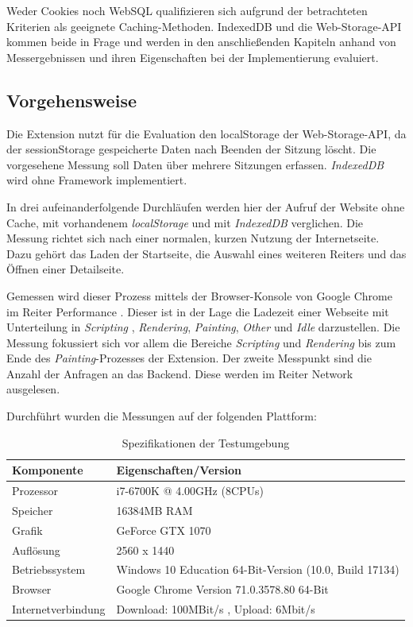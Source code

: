 Weder Cookies noch WebSQL qualifizieren sich aufgrund der betrachteten Kriterien als geeignete Caching-Methoden. IndexedDB und die Web-Storage-API kommen beide in Frage und werden in den anschließenden Kapiteln anhand von Messergebnissen und ihren Eigenschaften bei der Implementierung evaluiert.

\subsection{Vorgehensweise}
\label{ss:vorgehensweise}

Die Extension nutzt für die Evaluation den \glqq localStorage \grqq{} der Web-Storage-API, da der \glqq sessionStorage \grqq{} gespeicherte Daten nach Beenden der Sitzung löscht. Die vorgesehene Messung soll Daten über mehrere Sitzungen erfassen. \textit{IndexedDB} wird ohne Framework implementiert.

In drei aufeinanderfolgende Durchläufen werden hier der Aufruf der Website ohne Cache, mit vorhandenem \textit{localStorage} und mit \textit{IndexedDB} verglichen. Die Messung richtet sich nach einer normalen, kurzen Nutzung der Internetseite. Dazu gehört das Laden der Startseite, die Auswahl eines weiteren Reiters und das Öffnen einer Detailseite. 

Gemessen wird dieser Prozess mittels der Browser-Konsole von Google Chrome im Reiter \glqq Performance \grqq{}. Dieser ist in der Lage die Ladezeit einer Webseite mit Unterteilung in \textit{Scripting} , \textit{Rendering}, \textit{Painting}, \textit{Other} und \textit{Idle} darzustellen. Die Messung fokussiert sich vor allem die Bereiche \textit{Scripting} und \textit{Rendering} bis zum Ende des \textit{Painting}-Prozesses der Extension. Der zweite Messpunkt sind die Anzahl der Anfragen an das Backend. Diese werden im Reiter \glqq Network \grqq ausgelesen.

Durchführt wurden die Messungen auf der folgenden Plattform:

\begin{table}[h]
	\begin{tabular}{p{4.6cm}R{7.0cm}}
		\toprule
		\textbf{Komponente}	&	\textbf{Eigenschaften/Version}	\\
		\midrule
		Prozessor	&	i7-6700K @ 4.00GHz (8CPUs)	\\
		Speicher	&	16384MB RAM	\\
		Grafik	&	GeForce GTX 1070	\\
		Auflösung	&	2560 x 1440	\\
		\midrule
		Betriebssystem	&	Windows 10 Education 64-Bit-Version (10.0, Build 17134)	\\
		Browser	&	Google Chrome Version 71.0.3578.80 64-Bit	\\
		Internetverbindung	&	Download: 100MBit/s , Upload: 6Mbit/s	\\
		\bottomrule
	\end{tabular}
	\caption{Spezifikationen der Testumgebung}
	\label{cache3}
\end{table}

